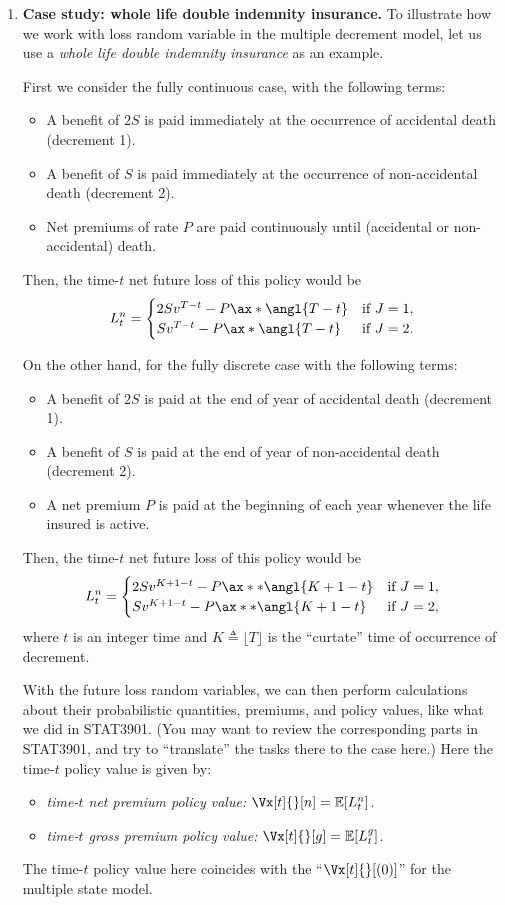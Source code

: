 \begin{enumerate}
\item \label{it:double-indemn} \textbf{Case study: whole life double indemnity
insurance.} To illustrate how we work with loss random variable in the multiple
decrement model, let us use a \emph{whole life double indemnity insurance} as
an example.

First we consider the fully continuous case, with the following terms:
\begin{itemize}
\item A benefit of \(2S\) is paid immediately at the occurrence of accidental death (decrement 1).
\item A benefit of \(S\) is paid immediately at the occurrence of non-accidental death (decrement 2).
\item Net premiums of rate \(P\) are paid continuously until (accidental or non-accidental) death.
\end{itemize}
Then, the time-\(t\) net future loss of this policy would be
\[
L_t^n=\begin{cases}
2Sv^{T-t}-P\ax*{\angl{T-t}}&\text{if \(J=1\)}, \\
Sv^{T-t}-P\ax*{\angl{T-t}}&\text{if \(J=2\)}.
\end{cases}
\]

On the other hand, for the fully discrete case with the following terms:
\begin{itemize}
\item A benefit of \(2S\) is paid at the end of year of accidental death (decrement 1).
\item A benefit of \(S\) is paid at the end of year of non-accidental death (decrement 2).
\item A net premium \(P\) is paid at the beginning of each year whenever the life insured is active.
\end{itemize}
Then, the time-\(t\) net future loss of this policy would be
\[
L_t^n=\begin{cases}
2Sv^{K+1-t}-P\ax**{\angl{K+1-t}}&\text{if \(J=1\)}, \\
Sv^{K+1-t}-P\ax**{\angl{K+1-t}}&\text{if \(J=2\)},
\end{cases}
\]
where \(t\) is an integer time and \(K\triangleq\lfloor T\rfloor\) is the
``curtate'' time of occurrence of decrement.

With the future loss random variables, we can then perform calculations about
their probabilistic quantities, premiums, and policy values, like what we did
in STAT3901. (You may want to review  the corresponding
parts in STAT3901, and try to ``translate'' the tasks there to the case here.)
Here the time-\(t\) policy value is given by:
\begin{itemize}
\item \emph{time-\(t\) net premium policy value:} \(\Vx[t]{}[n]=\expv{L_t^n}\).
\item \emph{time-\(t\) gross premium policy value:} \(\Vx[t]{}[g]=\expv{L_t^g}\).
\end{itemize}
The time-\(t\) policy value here coincides with the ``\(\Vx[t]{}[(0)]\)'' for
the multiple state model.
\end{enumerate}

